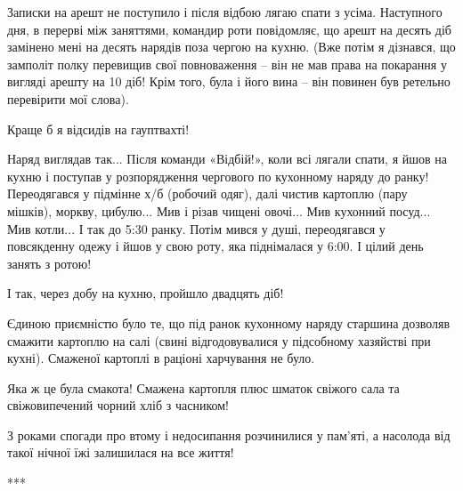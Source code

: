 Записки на арешт не поступило і після відбою лягаю спати з усіма. Наступного
дня, в перерві між заняттями, командир роти повідомляє, що арешт на десять діб
замінено мені на десять нарядів поза чергою на кухню. (Вже потім я дізнався, що
замполіт полку перевищив свої повноваження – він не мав права на покарання у
вигляді арешту на 10 діб! Крім того, була і його вина – він повинен був
ретельно перевірити мої слова).

Краще б я відсидів на гауптвахті! 

Наряд виглядав так... Після команди «Відбій!», коли всі лягали спати, я йшов на
кухню і поступав у розпорядження чергового по кухонному наряду до ранку!
Переодягався у підмінне х/б (робочий одяг), далі чистив картоплю (пару мішків),
моркву, цибулю... Мив і різав чищені овочі... Мив кухонний посуд... Мив котли... І так
до 5:30 ранку. Потім мився у душі, переодягався у повсякденну одежу і йшов у
свою роту, яка  піднімалася у 6:00. І цілий день занять з ротою! 

І так, через добу на кухню, пройшло двадцять діб!

Єдиною приємністю було те, що під ранок кухонному наряду старшина дозволяв
смажити картоплю на салі (свині відгодовувалися у підсобному хазяйстві при
кухні). Смаженої картоплі в раціоні харчування не було. 

Яка ж це була смакота! Смажена картопля плюс шматок свіжого сала та
свіжовипечений чорний хліб з часником!

З роками спогади про втому і недосипання розчинилися у пам’яті, а насолода від
такої нічної їжі залишилася на все життя!

***

